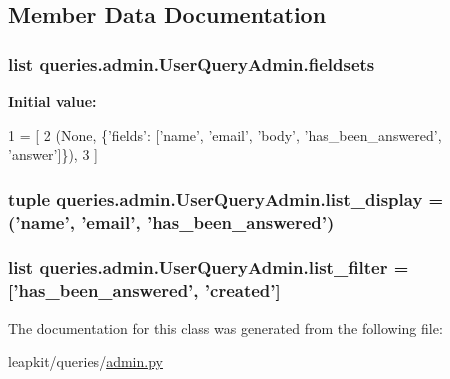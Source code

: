 \subsection{Member Data Documentation}
\hypertarget{classqueries_1_1admin_1_1_user_query_admin_a369ffda8f3363d028b542c32f295d82a}{
\subsubsection[{fieldsets}]{\setlength{\rightskip}{0pt plus 5cm}list queries.\-admin.\-User\-Query\-Admin.\-fieldsets\hspace{0.3cm}{\ttfamily [static]}}}\label{classqueries_1_1admin_1_1_user_query_admin_a369ffda8f3363d028b542c32f295d82a}
{\bfseries Initial value\-:}
\begin{DoxyCode}
1 = [
2         (\textcolor{keywordtype}{None}, \{\textcolor{stringliteral}{'fields'}: [\textcolor{stringliteral}{'name'}, \textcolor{stringliteral}{'email'}, \textcolor{stringliteral}{'body'}, \textcolor{stringliteral}{'has\_been\_answered'}, \textcolor{stringliteral}{'answer'}]\}),
3     ]
\end{DoxyCode}
\hypertarget{classqueries_1_1admin_1_1_user_query_admin_abe549c6c0f4a01da2772a23a03758521}{
\subsubsection[{list\-\_\-display}]{\setlength{\rightskip}{0pt plus 5cm}tuple queries.\-admin.\-User\-Query\-Admin.\-list\-\_\-display = ('name', 'email', 'has\-\_\-been\-\_\-answered')\hspace{0.3cm}{\ttfamily [static]}}}\label{classqueries_1_1admin_1_1_user_query_admin_abe549c6c0f4a01da2772a23a03758521}
\hypertarget{classqueries_1_1admin_1_1_user_query_admin_a34dc6e73185a2e292bd05e34e42536cb}{
\subsubsection[{list\-\_\-filter}]{\setlength{\rightskip}{0pt plus 5cm}list queries.\-admin.\-User\-Query\-Admin.\-list\-\_\-filter = \mbox{[}'has\-\_\-been\-\_\-answered', 'created'\mbox{]}\hspace{0.3cm}{\ttfamily [static]}}}\label{classqueries_1_1admin_1_1_user_query_admin_a34dc6e73185a2e292bd05e34e42536cb}


The documentation for this class was generated from the following file\-:\begin{DoxyCompactItemize}
\item 
leapkit/queries/\hyperlink{queries_2admin_8py}{admin.\-py}\end{DoxyCompactItemize}
